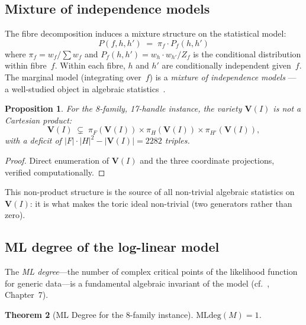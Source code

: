 \documentclass[preprint,12pt]{elsarticle}
\newtheorem{theorem}{Theorem}[section]
\newtheorem{proposition}[theorem]{Proposition}
\theoremstyle{definition}
\theoremstyle{remark}
\newcommand{\Var}{\mathbf{V}}
\begin{document}
\subsection{Mixture of independence models}

The fibre decomposition induces a mixture structure on
the statistical model:
\[
  P(f, h, h') \;=\; \pi_f \cdot P_f(h, h')
\]
where $\pi_f = w_f / \sum w_f$ and
$P_f(h, h') = w_h \cdot w_{h'} / Z_f$ is the conditional
distribution within fibre~$f$.  Within each fibre,
$h$ and $h'$ are conditionally independent given~$f$.
The marginal model (integrating over~$f$) is a
\emph{mixture of independence models} --- a well-studied
object in algebraic statistics~\cite{PS05}.

\begin{proposition}\label{prop:not-product}
For the 8-family, 17-handle instance, the variety $\Var(I)$ is not
a Cartesian product:
\[
  \Var(I) \;\subsetneq\; \pi_F(\Var(I)) \times \pi_H(\Var(I)) \times \pi_{H'}(\Var(I)),
\]
with a deficit of $|F| \cdot |H|^2 - |\Var(I)| = 2282$ triples.
\end{proposition}

\begin{proof}
Direct enumeration of $\Var(I)$ and the three coordinate
projections, verified computationally.
\end{proof}

This non-product structure is the source of all
non-trivial algebraic statistics on~$\Var(I)$: it is
what makes the toric ideal non-trivial (two generators
rather than zero).


\subsection{ML degree of the log-linear model}\label{sec:mldeg}

The \emph{ML degree}---the number of complex
critical points of the likelihood function for generic data---is
a fundamental algebraic invariant of the model
(cf.~\cite{DSS09}, Chapter~7).

\begin{theorem}[ML Degree for the 8-family instance]\label{thm:mldeg}
$\mathrm{MLdeg}(M) = 1$.
\end{theorem}
\end{document}
